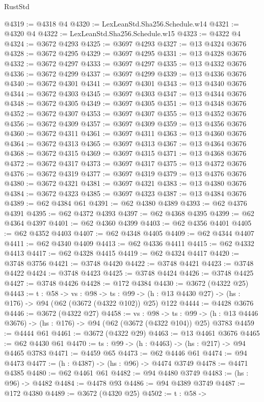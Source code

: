 \begin{lexlean}{RustStd}
\begin{coremodule}
{\begin{coremodule}
{{{{{{{{{@4319 := @4318 @4
@4320 := LexLeanStd.Sha256.Schedule.w14
@4321 := @4320 @4
@4322 := LexLeanStd.Sha256.Schedule.w15
@4323 := @4322 @4
@4324 := @3672 @4293
@4325 := @3697 @4293
@4327 := @13 @4324 @3676
@4328 := @3672 @4295
@4329 := @3697 @4295
@4331 := @13 @4328 @3676
@4332 := @3672 @4297
@4333 := @3697 @4297
@4335 := @13 @4332 @3676
@4336 := @3672 @4299
@4337 := @3697 @4299
@4339 := @13 @4336 @3676
@4340 := @3672 @4301
@4341 := @3697 @4301
@4343 := @13 @4340 @3676
@4344 := @3672 @4303
@4345 := @3697 @4303
@4347 := @13 @4344 @3676
@4348 := @3672 @4305
@4349 := @3697 @4305
@4351 := @13 @4348 @3676
@4352 := @3672 @4307
@4353 := @3697 @4307
@4355 := @13 @4352 @3676
@4356 := @3672 @4309
@4357 := @3697 @4309
@4359 := @13 @4356 @3676
@4360 := @3672 @4311
@4361 := @3697 @4311
@4363 := @13 @4360 @3676
@4364 := @3672 @4313
@4365 := @3697 @4313
@4367 := @13 @4364 @3676
@4368 := @3672 @4315
@4369 := @3697 @4315
@4371 := @13 @4368 @3676
@4372 := @3672 @4317
@4373 := @3697 @4317
@4375 := @13 @4372 @3676
@4376 := @3672 @4319
@4377 := @3697 @4319
@4379 := @13 @4376 @3676
@4380 := @3672 @4321
@4381 := @3697 @4321
@4383 := @13 @4380 @3676
@4384 := @3672 @4323
@4385 := @3697 @4323
@4387 := @13 @4384 @3676
@4389 := @62 @4384 @61
@4391 := @62 @4380 @4389
@4393 := @62 @4376 @4391
@4395 := @62 @4372 @4393
@4397 := @62 @4368 @4395
@4399 := @62 @4364 @4397
@4401 := @62 @4360 @4399
@4403 := @62 @4356 @4401
@4405 := @62 @4352 @4403
@4407 := @62 @4348 @4405
@4409 := @62 @4344 @4407
@4411 := @62 @4340 @4409
@4413 := @62 @4336 @4411
@4415 := @62 @4332 @4413
@4417 := @62 @4328 @4415
@4419 := @62 @4324 @4417
@4420 := @3748 @3756
@4421 := @3748 @4420
@4422 := @3748 @4421
@4423 := @3748 @4422
@4424 := @3748 @4423
@4425 := @3748 @4424
@4426 := @3748 @4425
@4427 := @3748 @4426
@4428 := @172 @4384
@4430 := @3672 (@4322 @25)
@4443 := {t : @58} ->
  {vs : @98} ->
  {ts : @99} -> (h : @13 @4430 @27) -> (hs : @176) -> @94 (@62 (@3672 (@4322 @102)) @25) @122
@4444 := @4428 @3676
@4446 := @3672 (@4322 @27)
@4458 := {vs : @98} ->
  {ts : @99} -> (h : @13 @4446 @3676) -> (hs : @176) -> @94 (@62 (@3672 (@4322 @104)) @25) @3783
@4459 := @4444 @61
@4461 := @3672 (@4322 @29)
@4463 := @13 @4461 @3676
@4465 := @62 @4430 @61
@4470 := {ts : @99} -> (h : @4463) -> (hs : @217) -> @94 @4465 @3783
@4471 := @4459 @65
@4473 := @62 @4446 @61
@4474 := @94 @4473
@4477 := (h : @4387) -> (hs : @96) -> @4474 @3749
@4478 := @4471 @4385
@4480 := @62 @4461 @61
@4482 := @94 @4480 @3749
@4483 := (hs : @96) -> @4482
@4484 := @4478 @93
@4486 := @94 @4389 @3749
@4487 := @172 @4380
@4489 := @3672 (@4320 @25)
@4502 := {t : @58} ->
}}}}}}}}}
\end{coremodule}}
\end{coremodule}
\end{lexlean}
